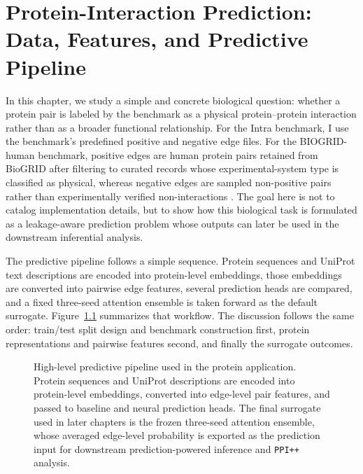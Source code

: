 \chapter{Protein-Interaction Prediction: Data, Features, and Predictive Pipeline} \label{chap:protein_pipeline}


In this chapter, we study a simple and concrete biological question: whether a protein pair is labeled by the benchmark as a physical protein--protein interaction rather than as a broader functional relationship. For the Intra benchmark, I use the benchmark's predefined positive and negative edge files. For the BIOGRID-human benchmark, positive edges are human protein pairs retained from BioGRID after filtering to curated records whose experimental-system type is classified as physical, whereas negative edges are sampled non-positive pairs rather than experimentally verified non-interactions \parencite{vidal2011, biogrid2019, luck2020}. The goal here is not to catalog implementation details, but to show how this biological task is formulated as a leakage-aware prediction problem whose outputs can later be used in the downstream inferential analysis.

The predictive pipeline follows a simple sequence. Protein sequences and UniProt text descriptions are encoded into protein-level embeddings, those embeddings are converted into pairwise edge features, several prediction heads are compared, and a fixed three-seed attention ensemble is taken forward as the default surrogate. Figure~\ref{fig:chap4_pipeline_overview} summarizes that workflow. The discussion follows the same order: train/test split design and benchmark construction first, protein representations and pairwise features second, and finally the surrogate outcomes.

\begin{figure}[htbp]
\centering
{}
\caption[Protein-edge predictive pipeline]{High-level predictive pipeline used in the protein application. Protein sequences and UniProt descriptions are encoded into protein-level embeddings, converted into edge-level pair features, and passed to baseline and neural prediction heads. The final surrogate used in later chapters is the frozen three-seed attention ensemble, whose averaged edge-level probability is exported as the prediction input for downstream prediction-powered inference and \texttt{PPI++} analysis.}
\label{fig:chap4_pipeline_overview}
\end{figure}

